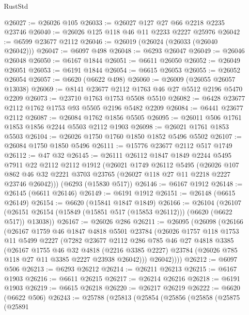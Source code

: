\begin{lexlean}{RustStd}
\begin{coremodule}
@26027 := @26026 @105
@26033 := @26027 @127 @27 @66 @2218 @2235 @23746
@26040 := @26026 @125 @118 @46 @11 @2233 @2227 @25976
@26042 := @6599 @23677 @2112
@26046 := @26019 (@26024 (@26033 (@26040 @26042)))
@26047 := @6097 @498
@26048 := @6293 @26047
@26049 := @26046 @26048
@26050 := @6167 @1844
@26051 := @6611 @26050
@26052 := @26049 @26051
@26053 := @6191 @1844
@26054 := @6615 @26053
@26055 := @26052 @26054
@26057 := @6620 (@6622 @498)
@26060 := @26009 (@26055 @26057 @13038)
@26069 := @8141 @23677 @2112 @1763 @46 @27 @5512 @2196 @5470 @2209
@26073 := @23710 @1763 @1753 @5508 @5510
@26082 := @6428 @23677 @2112 @1762 @1753 @93 @5505 @2196 @5482 @2209
@26084 := @6441 @23677 @2112
@26087 := @26084 @1762 @1856 @5505
@26095 := @26011 @506 @1761 @1853 @1856 @2244 @5503 @2112 @1903
@26098 := @26021 @1761 @1853 @5503
@26104 := @26026 @1750 @1760 @1850 @1852 @5496 @5502
@26107 := @26084 @1750 @1850 @5496
@26111 := @15776 @23677 @2112 @517 @1749
@26112 := @47 @32
@26145 := @26111
    @26112
    @1847
    @1849
    @2244
    @5495
    @7911
    @22
    @2112
    @2112
    @1912
    (@26021
      @1749
      @26112
      @5495
      (@26026 @107 @862 @46 @32 @2221 @3703 @23765 (@26027 @118 @27 @11 @2218 @2227 @23746 @26042)))
    (@6293 (@15830 @517))
@26146 := @6167 @1912
@26148 := @26145 (@6611 @26146)
@26149 := @6191 @1912
@26151 := @26148 (@6615 @26149)
@26154 := @6620 (@15841 @1847 @1849)
@26166 := @26104
    (@26107 (@26151 @26154 (@15849 (@15851 @517 (@15853 @26112))) (@6620 (@6622 @517)) @13038))
@26167 := @26026 @286
@26211 := @26095
    (@26098
      (@26166
        (@26167
          @1759
          @46
          @1847
          @4818
          @5501
          @23784
          (@26026
            @1757
            @118
            @1753
            @11
            @5499
            @2227
            (@7282
              @23677
              @2112
              @286
              @785
              @46
              @27
              @4818
              @3385
              (@26167
                @1755
                @46
                @32
                @4818
                (@2216 @3385 @2227)
                @23784
                (@26026 @785 @118 @27 @11 @3385 @2227 @23938 @26042)))
            @26042))))
@26212 := @6097 @506
@26213 := @6293 @26212
@26214 := @26211 @26213
@26215 := @6167 @1903
@26216 := @6611 @26215
@26217 := @26214 @26216
@26218 := @6191 @1903
@26219 := @6615 @26218
@26220 := @26217 @26219
@26222 := @6620 (@6622 @506)
@26243 := @25788
    (@25813
      (@25854
        (@25856
          (@25858
            (@25875
              (@25891

\end{coremodule}
\end{lexlean}
